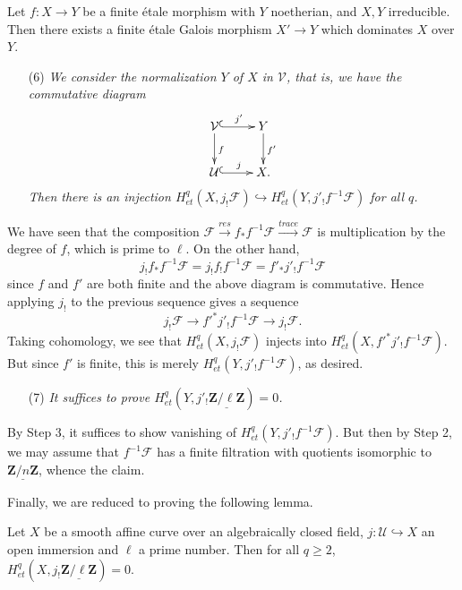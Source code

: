 \begin{exercise}
\label{exercise-finite-etale-under-galois}
Let $f: X \to Y$ be a finite \'etale morphism with $Y$ noetherian, and $X, Y$
irreducible. Then there exists a finite \'etale Galois morphism $X' \to Y$
which dominates $X$ over $Y$.
\end{exercise}

\begin{enumerate}
\item[(6)]
{\it We consider the normalization $Y$ of $X$ in $\mathcal{V}$, that is, we
have the commutative diagram
$$
\xymatrix{
\mathcal{V} \ar^{f}[d] \ar^{j'}@{^{(}->}[r] & Y \ar^{f'}[d] \\
\mathcal{U} \ar^{j}@{^{(}->}[r] & X.
}
$$
Then there is an injection $H_{et}^q(X, j_!\mathcal{F}) \hookrightarrow
H_{et}^q(Y, j'_! f^{-1} \mathcal{F})$ for all $q$.}
\end{enumerate}
We have seen that the composition $\mathcal{F} \xrightarrow{res} f_* f^{-1}
\mathcal{F} \xrightarrow{trace} \mathcal{F}$ is multiplication by the degree of
$f$, which is prime to $\ell$. On the other hand,
$$
j_! f_* f^{-1} \mathcal{F} = j_! f_! f^{-1} \mathcal{F} = f'_* j'_!
f^{-1}\mathcal{F}
$$
since $f$ and $f'$ are both finite and the above diagram is commutative. Hence
applying $j_!$ to the previous sequence gives a sequence
$$
j_! \mathcal{F} \longrightarrow f'^* j'_! f^{-1} \mathcal{F} \longrightarrow
j_! \mathcal{F}.
$$
Taking cohomology, we see that $H_{et}^q(X, j_!\mathcal{F})$ injects into
$H_{et}^q( X , f'^* j'_! f^{-1} \mathcal{F})$. But since $f'$ is finite, this
is merely $H_{et}^q( Y, j'_! f^{-1} \mathcal{F})$, as desired.
\begin{enumerate}
\item[(7)]
{\it It suffices to prove $H_{et}^q (Y, j'_!
\underline{\mathbf{Z}/\ell\mathbf{Z}}) = 0$.}
\end{enumerate}
By Step 3, it suffices to show vanishing of $H_{et}^q( Y, j'_! f^{-1}
\mathcal{F})$. But then by Step 2, we may assume that $f^{-1}\mathcal{F}$ has a
finite filtration with quotients isomorphic to
$\underline{\mathbf{Z}/n\mathbf{Z}}$, whence the claim.

\medskip\noindent
Finally, we are reduced to proving the following lemma.

\begin{lemma}
\label{lemma-even-easier}
Let $X$ be a smooth affine curve over an algebraically closed field, $j:
\mathcal{U} \hookrightarrow X$ an open immersion and $\ell$ a prime number.
Then for all $q \geq 2$, $H_{et}^q(X, j_!
\underline{\mathbf{Z}/\ell\mathbf{Z}}) = 0$.
\end{lemma}

